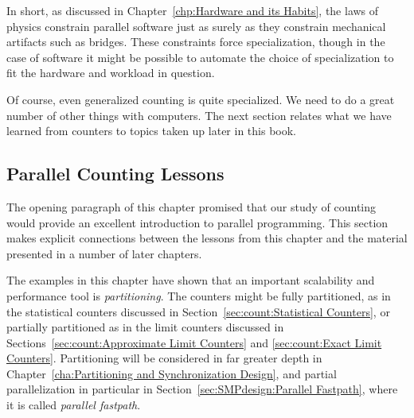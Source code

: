 In short, as discussed in
Chapter~\ref{chp:Hardware and its Habits},
the laws of physics constrain parallel software just as surely as they
constrain mechanical artifacts such as bridges.
These constraints force specialization, though in the case of software
it might be possible to automate the choice of specialization to
fit the hardware and workload in question.

Of course, even generalized counting is quite specialized.
We need to do a great number of other things with computers.
The next section relates what we have learned from counters to
topics taken up later in this book.

\subsection{Parallel Counting Lessons}
\label{sec:count:Parallel Counting Lessons}

The opening paragraph of this chapter promised that our study of counting
would provide an excellent introduction to parallel programming.
This section makes explicit connections between the lessons from
this chapter and the material presented in a number of later chapters.

The examples in this chapter have shown that an important scalability
and performance tool is \emph{partitioning}.
The counters might be fully partitioned, as in the statistical counters
discussed in Section~\ref{sec:count:Statistical Counters},
or partially partitioned as in the limit counters discussed in
Sections~\ref{sec:count:Approximate Limit Counters} and
\ref{sec:count:Exact Limit Counters}.
Partitioning will be considered in far greater depth in
Chapter~\ref{cha:Partitioning and Synchronization Design},
and partial parallelization in particular in
Section~\ref{sec:SMPdesign:Parallel Fastpath}, where it is called
\emph{parallel fastpath}.

